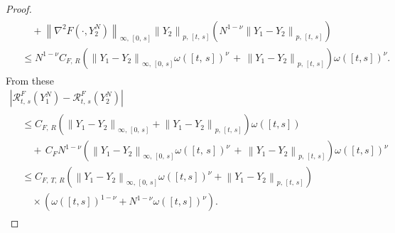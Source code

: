 \documentclass[AHL,Unicode,longabstracts,published]{cedram}
\newcommand{\calR}{\mathcal{R}}
\begin{document}
\begin{proof}
\begin{multline*}
\begin{aligned}
&\quad+\left\|\nabla^2 F\left(\cdot, Y^N_2\right)\right\|_{\infty,\,[0,\,s]} \left\|Y_2\right\|_{p,\, [t,\,s]} \left(N^{1-\nu}\left\|Y_1-Y_2\right\|_{p,\,[t,\,s]}\right)\\
&\leq N^{1-\nu}C_{F,\,R}\left(\left\|Y_1-Y_2\right\|_{\infty,\,[0,\,s]} \omega([t,\,s])^{\nu}\, +\,\left\|Y_1-Y_2\right\|_{p,\,[t,\,s]}\right) \omega([t,s])^{\nu}.
\end{aligned}
\end{multline*}
From these
\begin{multline}\label{chp3eq:rfyholder}
\left|\calR^{F}_{t,\,s}\left(Y^N_1\right)-\calR^{F}_{t,\,s}\left(Y^N_2\right)\right|\\
\begin{aligned}
&\leq C_{F,\,R}\left(\left\|Y_1-Y_2\right\|_{\infty,\,[0,\,s]} + \left\|Y_1-Y_2\right\|_{p,\,[t,\,s]}\right) \omega([t,s])\\
&\quad+\,C_F N^{1-\nu} \left(\left\|Y_1-Y_2\right\|_{\infty,\,[0,\,s]} \omega([t,\,s])^{\nu}\, +\,\left\|Y_1-Y_2\right\|_{p,\,[t,\,s]}\right) \omega([t,s])^{\nu}\\
&\leq C_{F,\,T,\,R}\left(\left\|Y_1-Y_2\right\|_{\infty,\,[0,\,s]} \omega([t,s])^{\nu}+\left\|Y_1-Y_2\right\|_{p,\,[t,\,s]}\right)\\
&\quad\times\left(\omega([t,s])^{1-\nu}+N^{1-\nu} \omega([t,s])^{\nu}\right).
\end{aligned}
\end{multline}


\end{proof}
\end{document}
